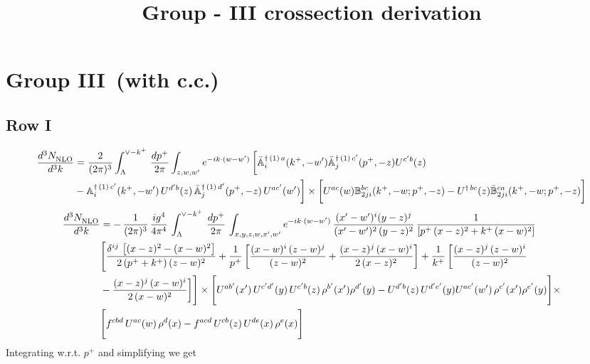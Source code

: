 \documentclass[9pt]{article}
\title{Group - III crossection derivation}
\author{}
\date{}
\def\mf#1{\mathbb{#1}}
\numberwithin{equation}{section}
\begin{document}
\maketitle
\section{Group III\, (with c.c.)}
\subsection{Row I\, }
\begin{align}
 \frac{d^{3}N_{\rm NLO}^{\rm}}{d^{3}k}  & =    \frac{2}{(2\pi)^{3}} \int_{\Lambda}^{\vee - k^{+}}\, \frac{dp^{+}}{2\pi}\int_{z,w,w^{\prime}} e^{-ik\cdot (w-w')}\, 
        \bigg[\Bar{\mf{A}}^{\dagger\, (1)\, a}_{i}(k^{+},-w^{\prime})\Bar{\mf{A}}^{\dagger\, (1)\, c^{\prime}}_{j}(p^{+},-z)U^{c^{\prime}b}(z)\notag \\ & -\mf{A}^{\dagger\, (1)\, c^{\prime}}_{i}(k^{+},- w^{\prime})\,U^{d^{\prime}b}(z)\,\Bar{\mf{A}}^{\dagger\, (1)\, d^{\prime}}_{j}(p^{+},-z)\,U^{ac^{\prime}}(w^{\prime})  \bigg]\times \bigg[U^{ac}(w) \mf{B}^{bc}_{2ji}(k^{+},-w;p^{+},-z) -U^{\dagger\, bc}(z)\Bar{\mf{B}}^{ca}_{2ji}(k^{+},-w; p^{+},-z)\bigg] \nonumber
\end{align}
\begin{align}
    \frac{d^{3}N_{\rm NLO}^{\rm}}{d^{3}k}  & =  -\,\frac{1}{(2\pi)^{3}}\,\frac{ig^{4}}{4\pi^{4}}\, \int_{\Lambda}^{\vee-k^{+}}\, \frac{dp^{+}}{2\pi}\, \int_{x,y,z,w,x',w^{\prime}} e^{-ik\cdot (w-w')}\, \frac{(x'-w')^{i}(y-z)^{j}}{(x'-w')^{2}\,(y-z)^{2}}\, \frac{1}{\left[p^{+}\,(x-z)^{2}+k^{+}\,(x-w)^{2}\right]}\notag \\ & \Bigg[\frac{\delta^{ij}\, \left[(x-z)^{2}-(x-w)^{2}\right]}{2\, (p^{+}+k^{+})\,(z-w)^{2}}+\frac{1}{p^{+}}\, \bigg[\frac{(x-w)^{i}\,(z-w)^{j}}{(z-w)^{2}}+\frac{(x-z)^{j}\,(x-w)^{i}}{2\,(x-z)^{2}}\bigg]+\frac{1}{k^{+}}\,\bigg[\frac{(x-z)^{j}\,(z-w)^{i}}{(z-w)^{2}}\notag \\ & -\frac{(x-z)^{j}\,(x-w)^{i}}{2\,(x-w)^{2}}\bigg]\Bigg]\times \Bigg[U^{ab'}(x')\,U^{c'd'}(y)\,U^{c'b}(z)\,\rho^{b'}(x')\rho^{d'}(y)-U^{d'b}(z)\,U^{d'e'}(y)U^{ac'}(w')\,\rho^{c'}(x')\rho^{e'}(y)\Bigg]\times \notag \\ & \Bigg[f^{cbd}\,U^{ac}(w)\,\rho^{d}(x)-f^{acd}\, U^{cb}(z)\,U^{de}(x)\,\rho^{e}(x)\Bigg]
\end{align}
Integrating w.r.t. $p^{+}$ and simplifying we get
\end{document}

